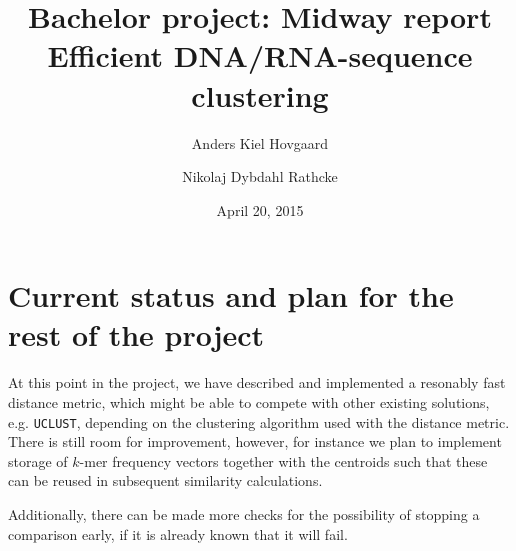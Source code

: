 \documentclass[11pt,a4paper]{article}
\title{Bachelor project: Midway report \\
       \vspace{2mm}
       {\LARGE Efficient DNA/RNA-sequence clustering}}
\author{Anders Kiel Hovgaard \and Nikolaj Dybdahl Rathcke}
\date{April 20, 2015}
\begin{document}
\maketitle
\thispagestyle{empty}
\newpage


\thispagestyle{plain}
\newpage

\tableofcontents
\thispagestyle{plain}
\newpage

\thispagestyle{fancy}







\section{Current status and plan for the rest of the project}

At this point in the project, we have described and implemented a resonably
fast distance metric, which might be able to compete with other existing
solutions, e.g. \texttt{UCLUST}, depending on the clustering algorithm used
with the distance metric. There is still room for improvement, however, for
instance we plan to implement storage of $k$-mer frequency vectors together
with the centroids such that these can be reused in subsequent similarity
calculations.

Additionally, there can be made more checks for the possibility of stopping a
comparison early, if it is already known that it will fail.


\newpage
\nocite{dong, hazelhurst, usearch, uclust}


\end{document}
